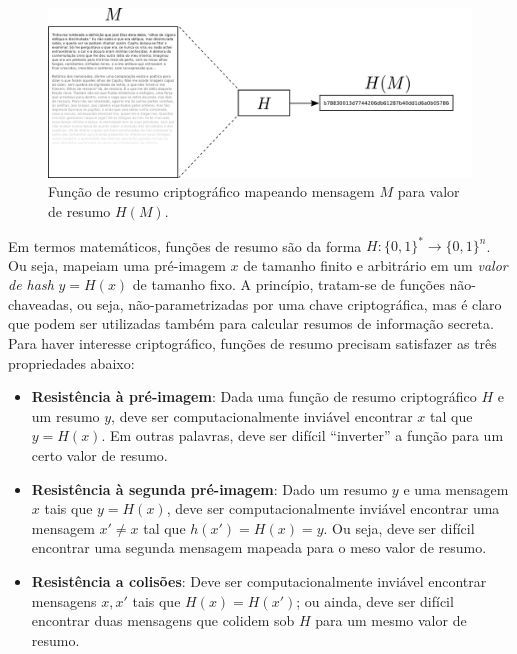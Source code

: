 \begin{figure}[htbp]
\begin{center}
    \includegraphics[scale=0.25]{figures/hash.pdf}
    \caption{Função de resumo criptográfico mapeando mensagem $M$ para valor de resumo $H(M)$.}
    \label{fig:hash}
\end{center}
\end{figure}

Em termos matemáticos, funções de resumo são da forma $H : \{0,1\}^* \rightarrow \{0,1\}^n$. Ou seja, mapeiam uma pré-imagem $x$ de tamanho finito e arbitrário em um \emph{valor de hash} $y = H(x)$ de tamanho fixo. A princípio, tratam-se de funções não-chaveadas, ou seja, não-parametrizadas por uma chave criptográfica, mas é claro que podem ser utilizadas também para calcular resumos de informação secreta. Para haver interesse criptográfico, funções de resumo precisam satisfazer as três propriedades abaixo:

\begin{itemize}
 \item {\bf Resistência à pré-imagem}: Dada uma função de resumo criptográfico $H$ e um resumo $y$, deve ser computacionalmente inviável encontrar $x$ tal que $y = H(x)$. Em outras palavras, deve ser difícil ``inverter'' a função para um certo valor de resumo.
 \item {\bf Resistência à segunda pré-imagem}: Dado um resumo $y$ e uma mensagem $x$ tais que $y = H(x)$, deve ser computacionalmente inviável encontrar uma mensagem $x' \neq x$ tal que $h(x') = H(x) = y$. Ou seja, deve ser difícil encontrar uma segunda mensagem mapeada para o meso valor de resumo.
 \item {\bf Resistência a colisões}: Deve ser computacionalmente inviável encontrar mensagens $x, x'$ tais que $H(x) = H(x')$; ou ainda, deve ser difícil encontrar duas mensagens que colidem sob $H$ para um mesmo valor de resumo.
\end{itemize}

